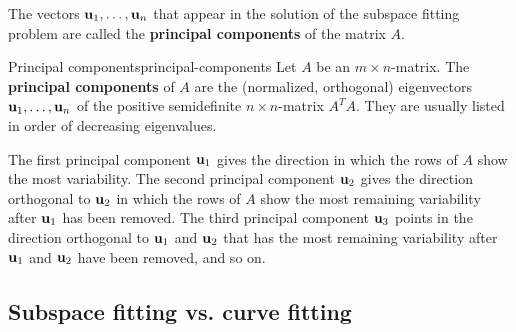 The vectors $\vect{u}_1,\ldots,\vect{u}_n$ that appear in the solution
of the subspace fitting problem are called the \textbf{principal
  components} of the matrix $A$.

\begin{definition}{Principal components}{principal-components}
  Let $A$ be an $m\times n$-matrix. The \textbf{principal components}%
   of $A$ are the (normalized, orthogonal)
  eigenvectors $\vect{u}_1,\ldots,\vect{u}_n$ of the positive
  semidefinite $n\times n$-matrix $A^TA$. They are usually listed in
  order of decreasing eigenvalues.

  The first principal component $\vect{u}_1$ gives the direction in
  which the rows of $A$ show the most variability. The second
  principal component $\vect{u}_2$ gives the direction orthogonal to
  $\vect{u}_2$ in which the rows of $A$ show the most remaining
  variability after $\vect{u}_1$ has been removed. The third principal
  component $\vect{u}_3$ points in the direction orthogonal to
  $\vect{u}_1$ and $\vect{u}_2$ that has the most remaining
  variability after $\vect{u}_1$ and $\vect{u}_2$ have been removed,
  and so on.
\end{definition}

\subsection*{Subspace fitting vs. curve fitting}

